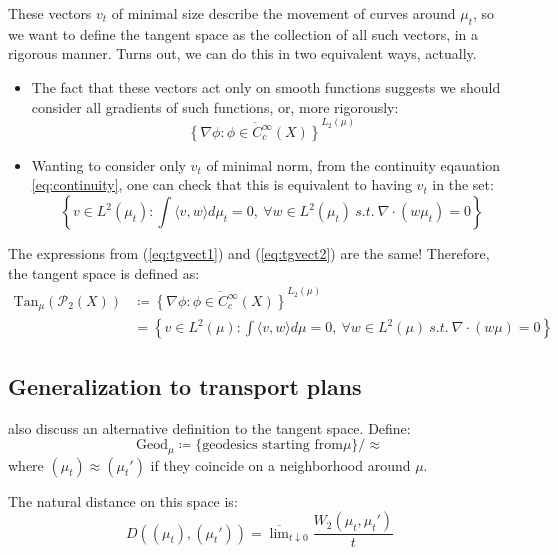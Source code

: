 \documentclass{article}
\begin{document}
These vectors $v_t$ of minimal size describe the movement of curves 
around $\mu_t$, so we want to define the tangent space as the collection 
of all such vectors, in a rigorous manner. Turns out, we can do this 
in two equivalent ways, actually.
\begin{itemize}
    \item The fact that these vectors act only on smooth functions suggests
    we should consider all gradients of such functions, or, more rigorously:
    \begin{equation}
        \label{eq:tgvect1}
        \overline{\left\{\nabla \phi : \phi\in C^\infty_c(X) \right\}}^{L_2(\mu)}
    \end{equation}
    \item Wanting to consider only $v_t$ of minimal norm, from the continuity
    eqauation \ref{eq:continuity}, one can check that this is equivalent to 
    having $v_t$ in the set:
    \begin{equation}
        \label{eq:tgvect2}
        \left\{v\in L^2(\mu_t) : \int\langle v,w\rangle d\mu_t = 0,\ \forall w \in L^2(\mu_t)\ s.t.\ \nabla\cdot(w\mu_t) = 0\right\}
    \end{equation}
\end{itemize}

The expressions from (\ref{eq:tgvect1}) and (\ref{eq:tgvect2}) are the same!
Therefore, the tangent space is defined as:
\begin{align*}
    \label{eq:tgvect}
    \text{Tan}_\mu(\mathscr{P}_2(X))&\coloneqq \overline{\left\{\nabla \phi : \phi\in C^\infty_c(X) \right\}}^{L_2(\mu)} \\
    &= \left\{v\in L^2(\mu) : \int\langle v,w\rangle d\mu = 0,\ \forall w \in L^2(\mu)\ s.t.\ \nabla\cdot(w\mu) = 0\right\}
\end{align*}

\subsection{Generalization to transport plans}

\cite{Ambrosio2013AUG} also discuss an alternative definition to the tangent space.
Define: 
\[\text{Geod}_\mu \coloneqq \{\text{geodesics starting from} \mu\}/\approx \]
where $(\mu_t)\approx (\mu_t')$ if they coincide on a neighborhood around $\mu$.

The natural distance on this space is:
\[D((\mu_t), (\mu_t')) = \overline{\lim}_{t\downarrow 0} \frac{W_2(\mu_t, \mu_t')}{t}\]
\end{document}
